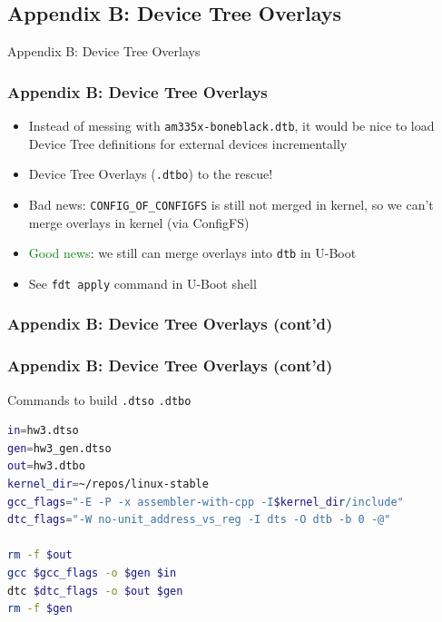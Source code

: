 \documentclass[aspectratio=169,usenames,dvipsnames]{beamer}
\newcounter{cont}
\begin{document}
\subsection{Appendix B: Device Tree Overlays}

\begin{frame}[standout]
  Appendix B: Device Tree Overlays
\end{frame}

\begin{frame}
  \frametitle{Appendix B: Device Tree Overlays}
  \begin{itemize}
    \item Instead of messing with \texttt{am335x-boneblack.dtb}, it would be
          nice to load Device Tree definitions for external devices
          incrementally
    \item Device Tree Overlays (\texttt{.dtbo}) to the rescue!
    \item \alert{Bad news}: \texttt{CONFIG\_OF\_CONFIGFS} is still not merged
          in kernel, so we can't merge overlays in kernel (via ConfigFS)
    \item \textcolor{green}{Good news}: we still can merge overlays into
          \texttt{dtb} in U-Boot
    \item See \texttt{fdt apply} command in U-Boot shell
  \end{itemize}
\end{frame}

\begin{frame}[containsverbatim,allowframebreaks=1]
  \frametitle{Appendix B: Device Tree Overlays (cont'd)}
  
\end{frame}

\begin{frame}[containsverbatim]
  \frametitle{Appendix B: Device Tree Overlays (cont'd)}
  Commands to build \texttt{.dtso} \textrightarrow \texttt{.dtbo}
  \begin{lstlisting}[language=bash,numbers=none]
in=hw3.dtso
gen=hw3_gen.dtso
out=hw3.dtbo
kernel_dir=~/repos/linux-stable
gcc_flags="-E -P -x assembler-with-cpp -I$kernel_dir/include"
dtc_flags="-W no-unit_address_vs_reg -I dts -O dtb -b 0 -@"

rm -f $out
gcc $gcc_flags -o $gen $in
dtc $dtc_flags -o $out $gen
rm -f $gen
  \end{lstlisting}
\end{frame}
\end{document}
